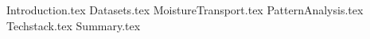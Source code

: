 \documentclass[aspectratio=169]{beamer}
\begin{document}
\maketitlepage %
\maketableofcontents %
\makesubsectionpopup %

{Introduction.tex}
{Datasets.tex}
{MoistureTransport.tex}
{PatternAnalysis.tex}
{Techstack.tex}
{Summary.tex}
\end{document}
